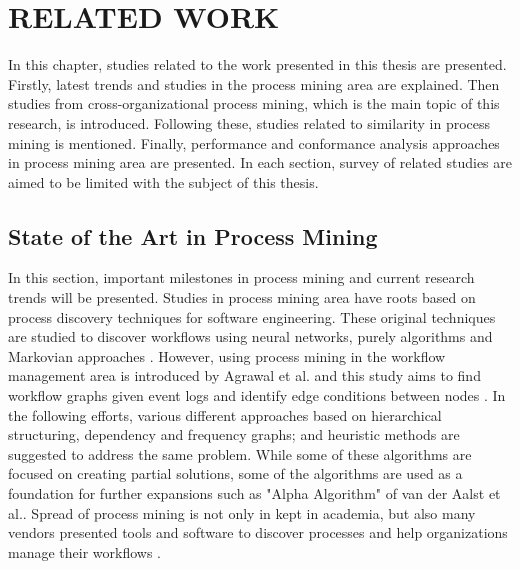 \chapter{RELATED WORK}
\label{chp:relatedwork}

In this chapter, studies related to the work presented in this thesis are presented. Firstly, latest trends and studies in the process mining area are explained. Then studies from cross-organizational process mining, which is the main topic of this research, is introduced. Following these, studies related to similarity in process mining is mentioned. Finally, performance and conformance analysis approaches in process mining area are presented. In each section, survey of related studies are aimed to be limited with the subject of this thesis.

\section{State of the Art in Process Mining}
\label{sec:state-of-the-art-in-process-mining}

In this section, important milestones in process mining and current research trends will be presented. Studies in process mining area have roots based on process discovery techniques for software engineering. These original techniques are studied to discover workflows using neural networks, purely algorithms and Markovian approaches \cite{van2004process}. However, using process mining in the workflow management area is introduced by Agrawal et al. and this study aims to find workflow graphs given event logs and identify edge conditions between nodes \cite{agrawal1998mining}. In the following efforts, various different approaches based on hierarchical structuring, dependency and frequency graphs; and heuristic methods are suggested to address the same problem. While some of these algorithms are focused on creating partial solutions, some of the algorithms are used as a foundation for further expansions such as "Alpha Algorithm" of van der Aalst et al.\cite{van2004workflow}. Spread of process mining is not only in kept in academia, but also many vendors presented tools and software to discover processes and help organizations manage their workflows \cite{accorsi2014unleashing}.

